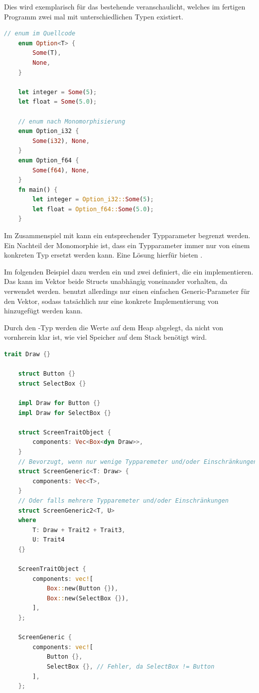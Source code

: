 \documentclass[11pt,a4paper, ngerman]{article}
\begin{document}
Dies wird exemplarisch für das bestehende   veranschaulicht, welches im fertigen Programm zwei mal mit unterschiedlichen Typen existiert.

\begin{lstlisting}[language=rust, caption={Monomorphisierung Veranschaulichung \cite{MonoCodeEx}}]
    // enum im Quellcode
    enum Option<T> {
        Some(T),
        None,
    }

    let integer = Some(5);
    let float = Some(5.0);
    
    // enum nach Monomorphisierung
    enum Option_i32 {
        Some(i32), None,
    }
    enum Option_f64 {
        Some(f64), None,
    }
    fn main() {
        let integer = Option_i32::Some(5);
        let float = Option_f64::Some(5.0);
    }
\end{lstlisting}

Im Zusammenspiel mit  kann ein entsprechender Typparameter begrenzt werden. Ein Nachteil der Monomorphie ist, dass ein Typparameter immer nur von einem konkreten Typ ersetzt werden kann. Eine Lösung hierfür bieten .

Im folgenden Beispiel dazu werden ein  und zwei  definiert, die ein  implementieren. Das  kann im Vektor  beide Structs unabhängig voneinander vorhalten, da  verwendet werden.  benutzt allerdings nur einen einfachen Generic-Parameter für den Vektor, sodass tatsächlich nur eine konkrete Implementierung von  hinzugefügt werden kann.

Durch den -Typ werden die Werte auf dem Heap abgelegt, da nicht von vornherein klar ist, wie viel Speicher auf dem Stack benötigt wird.

\begin{lstlisting}[language=rust, caption={Trait Boundaries \cite{TraitBoundariesEx}}]
    trait Draw {}

    struct Button {}
    struct SelectBox {}

    impl Draw for Button {}
    impl Draw for SelectBox {}

    struct ScreenTraitObject {
        components: Vec<Box<dyn Draw>>,
    }
    // Bevorzugt, wenn nur wenige Typparemeter und/oder Einschränkungen
    struct ScreenGeneric<T: Draw> {
        components: Vec<T>,
    }
    // Oder falls mehrere Typparemeter und/oder Einschränkungen
    struct ScreenGeneric2<T, U>
    where
        T: Draw + Trait2 + Trait3,
        U: Trait4
    {}

    ScreenTraitObject {
        components: vec![
            Box::new(Button {}),
            Box::new(SelectBox {}),
        ],
    };

    ScreenGeneric {
        components: vec![
            Button {},
            SelectBox {}, // Fehler, da SelectBox != Button
        ],
    };
\end{lstlisting}
\end{document}
